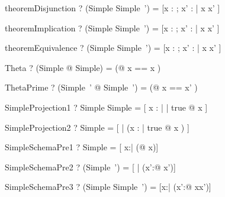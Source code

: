 \begin{theorem}{theoremDisjunction}
  \vdash? (Simple \lor Simple~') = [x : \arithmos; x' : \arithmos | x \in \nat \lor x' \in \nat]
\end{theorem}

\begin{theorem}{theoremImplication}
  \vdash? (Simple \implies Simple~') = [x : \arithmos; x' : \arithmos | x \in \nat \implies x' \in \nat]
\end{theorem}

\begin{theorem}{theoremEquivalence}
  \vdash? (Simple \iff Simple~') = [x : \arithmos; x' : \arithmos | x \in \nat \iff x' \in \nat]
\end{theorem}

\begin{theorem}{Theta}
  \vdash? (\mu Simple @ \theta Simple) =
          (\mu [x : \nat] @ \lblot x == x \rblot )
\end{theorem}

\begin{theorem}{ThetaPrime}
  \vdash? (\mu Simple~' @ \theta Simple~') =
          ( @ \lblot x == x' \rblot )
\end{theorem}

\begin{theorem}{SimpleProjection1}
  \vdash? Simple \project Simple = [ x : \nat | \exists | true @ x \in \nat ]
\end{theorem}

\begin{theorem}{SimpleProjection2}
  \vdash? Simple \project [| true] = [ | (\exists  x : \arithmos | true @ x \in \nat) ]
\end{theorem}

\begin{theorem}{SimpleSchemaPre1}
  \vdash? \pre Simple = [ x:\arithmos | (\exists @ x\in\nat)]
\end{theorem}

\begin{theorem}{SimpleSchemaPre2}
  \vdash? \pre (Simple~') = [ | (\exists x':\arithmos @ x'\in\nat)]
\end{theorem}

\begin{theorem}{SimpleSchemaPre3}
  \vdash? \pre (Simple \land Simple~') =
          [x:\arithmos | (\exists x':\arithmos @ x\in\nat \land x'\in\nat)]
\end{theorem}

